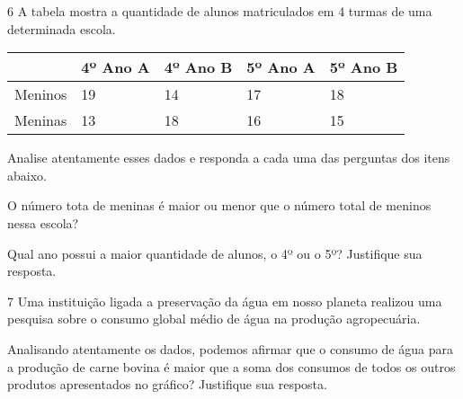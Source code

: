 
\num{6} A tabela mostra a quantidade de alunos matriculados em 4 turmas de
uma determinada escola.

\begin{longtable}[]{@{}lllll@{}}
\toprule
& 4º Ano A & 4º Ano B & 5º Ano A & 5º Ano B\tabularnewline
\midrule
\endhead
Meninos & 19 & 14 & 17 & 18\tabularnewline
Meninas & 13 & 18 & 16 & 15\tabularnewline
\bottomrule
\end{longtable}

Analise atentamente esses dados e responda a cada uma das perguntas dos
itens abaixo.

\begin{escolha}
\item
  O número tota de meninas é maior ou menor que o número total de
  meninos nessa escola?


\item
  Qual ano possui a maior quantidade de alunos, o 4º ou o 5º? Justifique
  sua resposta.

\end{escolha}


\num{7} Uma instituição ligada a preservação da água em nosso planeta
realizou uma pesquisa sobre o consumo global médio de água na produção
agropecuária.


Analisando atentamente os dados, podemos afirmar que o consumo de água
para a produção de carne bovina é maior que a soma dos consumos de todos
os outros produtos apresentados no gráfico? Justifique sua resposta.



